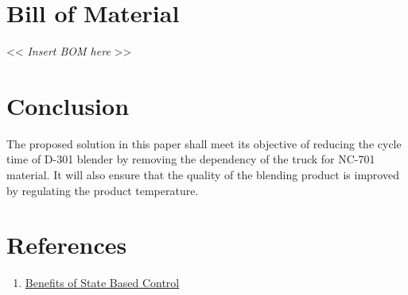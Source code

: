 \documentclass[a4paper,oneside]{article}
\begin{document}
\section{Bill of Material}
\label{sec:orge28e68a}
<< \emph{Insert BOM here} >>
\clearpage
\section{Conclusion}
\label{sec:orgc24ae22}
The proposed solution in this paper shall meet its objective of
reducing the cycle time of D-301 blender by removing the dependency of
the truck for NC-701 material. It will also ensure that the quality of
the blending product is improved by regulating the product
temperature.
\section{References}
\label{sec:org70fc1e5}
\begin{enumerate}
\item \href{https://www.controlglobal.com/assets/knowledge\_centers/abb/assets/Benefits-of-state-based-control-white-paper.pdf}{Benefits of State Based Control}
\end{enumerate}
\end{document}
